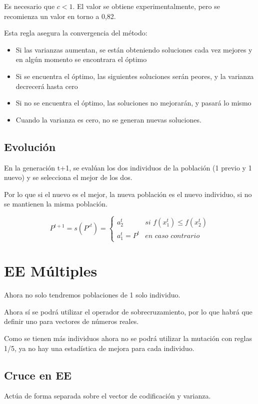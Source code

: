 \documentclass[12pt, twoside, openright]{report} %
\begin{document}
Es necesario que $c<1$. El valor se obtiene experimentalmente, pero se recomienza un valor en torno a 0,82.

Esta regla asegura la convergencia del método:
\begin{itemize}
	\item Si las varianzas aumentan, se están obteniendo soluciones cada vez mejores y en algún momento se encontrara el óptimo 
	\item Si se encuentra el óptimo, las siguientes soluciones serán peores, y la varianza decrecerá hasta cero 
	\item Si no se encuentra el óptimo, las soluciones no mejorarán, y pasará lo mismo 
	\item Cuando la varianza es cero, no se generan nuevas soluciones.
\end{itemize}

\subsection{Evolución}
En la generación t+1, se evalúan los dos individuos de la población (1 previo y 1 nuevo) y se selecciona el mejor de los dos.

Por lo que si el nuevo es el mejor, la nueva población es el nuevo individuo, si no se mantienen la misma población.

$$P^{t+1}=s(P'^t)= \begin{cases} 
	a^t_2 & \textit{si } f(x^t_1)\leq f(x^t_2)\\
	a^t_1 = P^t & \textit{en caso contrario}
 \end{cases}$$

\section{EE Múltiples}
Ahora no solo tendremos poblaciones de 1 solo individuo.

Ahora sí se podrá utilizar el operador de sobrecruzamiento, por lo que habrá que definir uno para vectores de números reales.

Como se tienen más individuos ahora no se podrá utilizar la mutación con reglas 1/5, ya no hay una estadística de mejora para cada individuo.

\subsection{Cruce en EE}
Actúa de forma separada sobre el vector de codificación y varianza.
\end{document}

